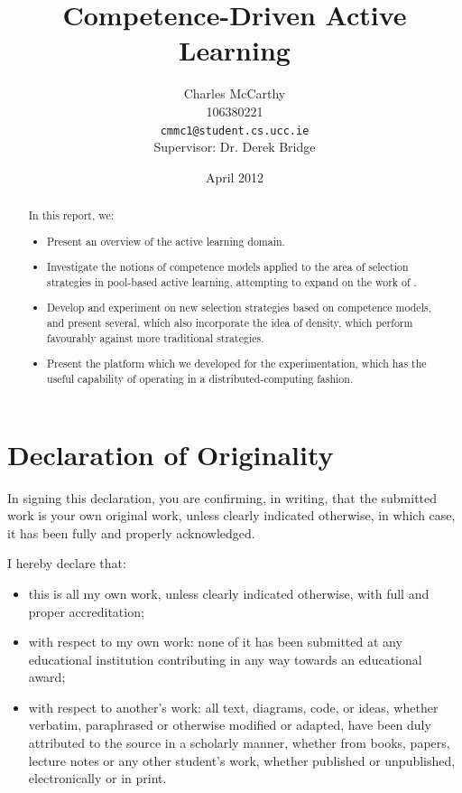 \documentclass[a4paper,11pt]{report}
\title{Competence-Driven Active Learning}
\author{Charles McCarthy\\
  106380221\\
  \texttt{cmmc1@student.cs.ucc.ie}
  \\Supervisor: Dr. Derek Bridge}
\date{April 2012}
\begin{document}
\maketitle

\begin{abstract}
In this report, we:
\begin{itemize}
\item Present an overview of the active learning domain.
\item Investigate the notions of competence models applied to the area of selection strategies in pool-based active learning, attempting to expand on the work of \citet{Delany2009}.
\item Develop and experiment on new selection strategies based on competence models, and present several, which also incorporate the idea of density, which perform favourably against more traditional strategies.
\item Present the platform which we developed for the experimentation, which has the useful capability of operating in a distributed-computing fashion.
\end{itemize}
\end{abstract}

\chapter*{Declaration of Originality}
\vspace*{\fill}
In signing this declaration, you are confirming, in writing, that the submitted work is your own original work, unless clearly indicated otherwise, in which case, it has been fully and properly acknowledged.

I hereby declare that:
\begin{itemize}
	\item this is all my own work, unless clearly indicated otherwise, with full and proper accreditation;
	\item with respect to my own work: none of it has been submitted at any educational institution contributing in any way towards an educational award;
	\item with respect to another's work: all text, diagrams, code, or ideas, whether verbatim, paraphrased or otherwise modified or adapted, have been duly attributed to the source in a scholarly manner, whether from books, papers, lecture notes or any other student's work, whether published or unpublished, electronically or in print. 
\end{itemize}
\end{document}
